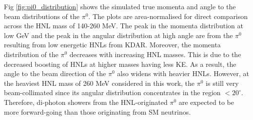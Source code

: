 Fig \ref{fig:pi0_distribution} shows the simulated true momenta and angle to the beam distributions of the $\pi^0$.
The plots are area-normalised for direct comparison across the HNL mass of 140-260 MeV. 
The peak in the momenta distribution at low GeV and the peak in the angular distribution at high angle are from the $\pi^0$ resulting from low energetic HNLs from KDAR.
Moreover, the momenta distribution of the $\pi^0$ decreases with increasing HNL masses.
This is due to the decreased boosting of HNLs at higher masses having less KE.
As a result, the angle to the beam direction of the $\pi^0$ also widens with heavier HNLs.
However, at the heaviest HNL mass of 260 MeV considered in this work, the $\pi^0$ is still very beam-collimated since its angular distribution concentrates in the region $< 20^\circ$. 
Therefore, di-photon showers from the HNL-originated $\pi^0$ are expected to be more forward-going than those originating from SM neutrinos.

